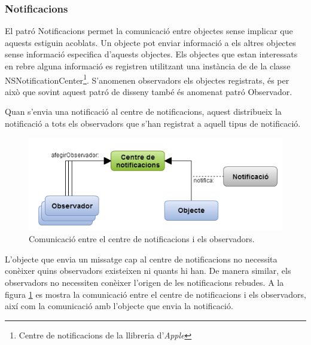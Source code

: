 
\subsubsection{Notificacions}
\label{sec:patro_notificacio}

El patró Notificacions permet la comunicació entre objectes sense implicar que aquests estiguin acoblats. Un objecte pot enviar informació a els altres objectes sense informació especifica d'aquests objectes. Els objectes que estan interessats en rebre alguna informació es registren utilitzant una instància de de la classe NSNotificationCenter\footnote{Centre de notificacions de la llibreria d'\textit{Apple}}. S'anomenen observadors els objectes registrats, és per això que sovint aquest patró de disseny també és anomenat patró Observador.

Quan s'envia una notificació al centre de notificacions, aquest distribueix la notificació a tots els observadors que s'han registrat a aquell tipus de notificació. 

\begin{figure}[ht]
    \centering
    \includegraphics[scale=1]{Memoria/Arquitectura/iOS/patro-notificacio.png}
    \caption{Comunicació entre el centre de notificacions i els observadors.}
    \label{fig:patro_notificacio}
\end{figure}


L'objecte que envia un missatge cap al centre de notificacions no necessita conèixer quins observadors existeixen ni quants hi han. De manera similar, els observadors no necessiten conèixer l'origen de les notificacions rebudes. A la figura \ref{fig:patro_notificacio} es mostra la comunicació entre el centre de notificacions i els observadors, així com la comunicació amb l'objecte que envia la notificació.



